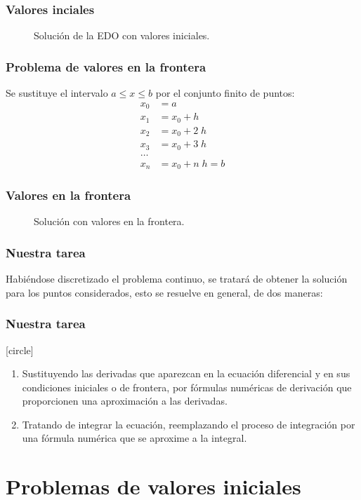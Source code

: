 \begin{frame}[fragile]
\frametitle{Valores inciales}
\begin{figure}
	\centering
	
	\caption{Solución de la EDO con valores iniciales.}
\end{figure}
\end{frame}
\begin{frame}
\frametitle{Problema de valores en la frontera}
Se sustituye el intervalo $a \leq x \leq b $ por el conjunto finito de puntos:
\begin{align*}
x_{0} & = a \\
x_{1} & = x_{0} + h \\
x_{2} & = x_{0} + 2 \; h \\
x_{3} & = x_{0} + 3 \; h \\
\ldots \\
x_{n} & = x_{0} + n \;h = b
\end{align*}
\end{frame}
\begin{frame}[fragile]
\frametitle{Valores en la frontera}
\begin{figure}
	\centering
	
	\caption{Solución con valores en la frontera.}
\end{figure}
\end{frame}
\begin{frame}
\frametitle{Nuestra tarea}
Habiéndose discretizado el problema continuo, se tratará de obtener la solución para los puntos considerados, esto se resuelve en general, de dos maneras:
\end{frame}
\begin{frame}
\frametitle{Nuestra tarea}
[circle]
\begin{enumerate}[<+->]
\item Sustituyendo las derivadas que aparezcan en la ecuación diferencial y en sus condiciones iniciales o de frontera, por fórmulas numéricas de derivación que proporcionen una aproximación a las derivadas.
\item Tratando de integrar la ecuación, reemplazando el proceso de integración por una fórmula numérica que se aproxime a la integral.
\end{enumerate}
\end{frame}
\section{Problemas de valores iniciales}
